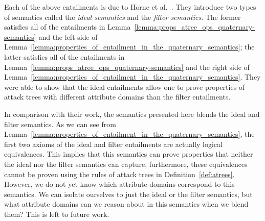 Each of the above entailments is due to Horne et
al.~\cite{horne2017semantics}.  They introduce two types of semantics
called the \emph{ideal semantics} and the \emph{filter semantics}.
The former satisfies all of the entailments in
Lemma~\ref{lemma:props_atree_ops_quaternary-semantics} and the left
side of
Lemma~\ref{lemma:properties_of_entailment_in_the_quaternary_semantics};
the latter satisfies all of the entailments in
Lemma~\ref{lemma:props_atree_ops_quaternary-semantics} and the right
side of
Lemma~\ref{lemma:properties_of_entailment_in_the_quaternary_semantics}.
They were able to show that the ideal entailments allow one to prove
properties of attack trees with different attribute domains than the
filter entailments.

In comparison with their work, the semantics presented here blends the
ideal and filter semantics. As we can see from
Lemma~\ref{lemma:properties_of_entailment_in_the_quaternary_semantics},
the first two axioms of the ideal and filter entailments are actually
logical equivalences. This implies that this semantics can prove
properties that neither the ideal nor the filter semantics can
capture, furthermore, these equivalences cannot be proven using the
rules of attack trees in Definition~\ref{def:atrees}.  However, we do
not yet know which attribute domains correspond to this semantics.  We
can isolate ourselves to just the ideal or the filter semantics, but
what attribute domains can we reason about in this semantics when we
blend them?  This is left to future work.

